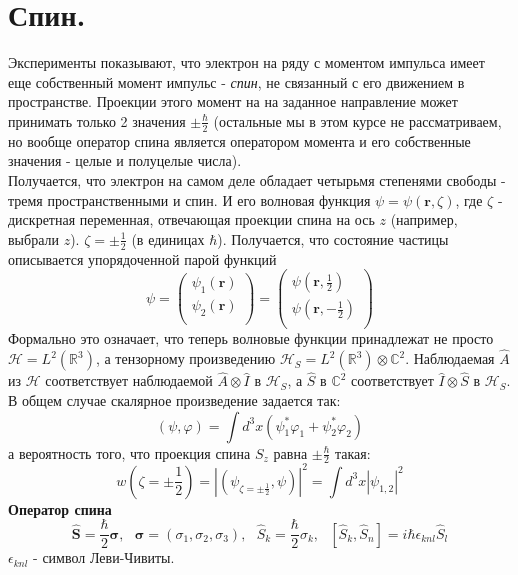 \section{Спин.}
	Эксперименты показывают, что электрон на ряду с моментом импульса имеет еще собственный момент импульс - \textit{спин}, не связанный с его движением в пространстве. Проекции этого момент на на заданное направление может принимать только 2 значения $\pm\frac{\hbar}{2}$ (остальные мы в этом курсе не рассматриваем, но вообще оператор спина является оператором момента и его собственные значения - целые и полуцелые числа). \\
	Получается, что электрон на самом деле обладает четырьмя степенями свободы - тремя пространственными и спин. И его волновая функция $\psi = \psi(\textbf{r}, \zeta)$, где $\zeta$ - дискретная переменная, отвечающая проекции спина на ось $z$ (например, выбрали $z$). $\zeta=\pm\frac{1}{2}$ (в единицах $\hbar$). Получается, что состояние частицы описывается упорядоченной парой функций
	$$
		\psi = \left( 
		\begin{array}{c}
			\psi_1(\textbf{r}) \\
			\psi_2(\textbf{r}) \\
		\end{array} 
		\right) = \left( 
		\begin{array}{c}
			\psi(\textbf{r}, \frac{1}{2}) \\
			\psi(\textbf{r}, -\frac{1}{2}) \\
		\end{array} \right) 
	$$
	Формально это означает, что теперь волновые функции принадлежат не просто $\mathcal{H}=L^2(\mathbb{R}^3)$, а тензорному произведению $\mathcal{H}_S = L^2(\mathbb{R}^3)\otimes\mathbb{C}^2$. Наблюдаемая $\hat{A}$ из $\mathcal{H}$ соответствует наблюдаемой $\hat{A}\otimes\hat{I}$ в $\mathcal{H}_S$, а $\hat{S}$ в $\mathbb{C}^2$ соответствует $\hat{I}\otimes\hat{S}$ в $\mathcal{H}_S$. В общем случае скалярное произведение задается так: 
	$$
		(\psi,\varphi) = \int d^3x (\psi_1^{*}\varphi_1 + \psi_2^{*}\varphi_2)
	$$
	а вероятность того, что проекция спина $S_z$ равна $\pm\frac{\hbar}{2}$ такая:
	$$
		w\left(\zeta = \pm\frac{1}{2}\right) = |(\psi_{\zeta=\pm\frac{1}{2}},\psi)|^2 = \int d^3x |\psi_{1,2}|^2
	$$
	\noindent\textbf{Оператор спина}\\
	$$	
		\hat{\textbf{S}} = \frac{\hbar}{2}\bm{\sigma}, \ \ \ \bm{\sigma} = (\sigma_1,\sigma_2,\sigma_3), \ \ \ \hat{S}_k = \frac{\hbar}{2}\sigma_k, \ \ \ [\hat{S}_k, \hat{S}_n] = i\hbar\epsilon_{knl}\hat{S}_l
	$$
	$\epsilon_{knl}$ - символ Леви-Чивиты.\\
